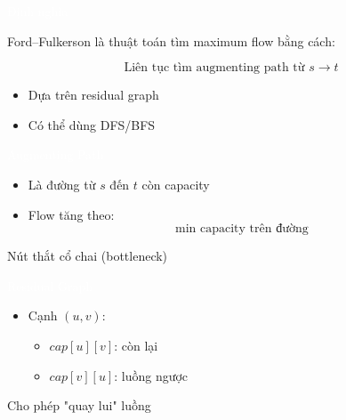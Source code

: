 \documentclass{beamer}
\title{\hlred{Ford–Fulkerson Algorithm}}
\author{Group 3}
\date{\hlcyan{03/2026}}
\newcommand{\hlblue}[1]{\textcolor{myblue}{#1}}
\newcommand{\hlgreen}[1]{\textcolor{mygreen}{#1}}
\newcommand{\hlred}[1]{\textcolor{myred}{#1}}
\newcommand{\hlpurple}[1]{\textcolor{mypurple}{#1}}
\newcommand{\hlwhite}[1]{\textcolor{white}{#1}}
\begin{document}
\frame{\titlepage}


\begin{frame}{\hlwhite{Định nghĩa}}
\begin{tcolorbox}[title=\textbf{\hlwhite{Ý tưởng}}]
\hlblue{Ford–Fulkerson} là thuật toán tìm \hlred{maximum flow} bằng cách:

\[
\text{Liên tục tìm augmenting path từ } s \rightarrow t
\]
\end{tcolorbox}

\begin{itemize}
\item Dựa trên \hlgreen{residual graph}
\item Có thể dùng DFS/BFS
\end{itemize}
\end{frame}


\begin{frame}{\hlwhite{Augmenting Path}}
\begin{itemize}
\item Là đường từ $s$ đến $t$ còn capacity
\item Flow tăng theo:
\[
\min \text{ capacity trên đường}
\]
\end{itemize}

\begin{tcolorbox}
\centering
\hlpurple{Nút thắt cổ chai (bottleneck)}
\end{tcolorbox}
\end{frame}


\begin{frame}{\hlwhite{Residual Graph}}
\begin{itemize}
\item Cạnh $(u,v)$:
\begin{itemize}
\item $cap[u][v]$: còn lại
\item $cap[v][u]$: luồng ngược
\end{itemize}
\end{itemize}

\begin{tcolorbox}
\centering
\hlred{Cho phép "quay lui" luồng}
\end{tcolorbox}
\end{frame}
\end{document}
